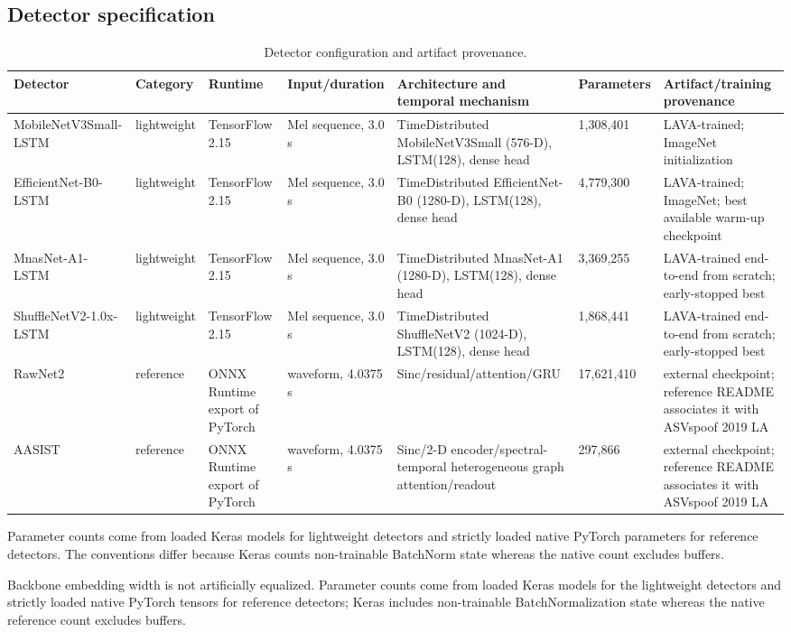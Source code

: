 \documentclass[10pt,journal]{IEEEtran}
\begin{document}
\subsection{Detector specification}
\begin{table}[htbp]
\centering
\small
\caption{Detector configuration and artifact provenance.}
\label{tab:4}
\begin{tabularx}{\textwidth}{lXXXXXX}
\toprule
Detector & Category & Runtime & Input/duration & Architecture and temporal mechanism & Parameters & Artifact/training provenance \\
\midrule
MobileNetV3Small-LSTM & lightweight & TensorFlow 2.15 & Mel sequence, 3.0 s & TimeDistributed MobileNetV3Small (576-D), LSTM(128), dense head & 1,308,401 & LAVA-trained; ImageNet initialization \\
EfficientNet-B0-LSTM & lightweight & TensorFlow 2.15 & Mel sequence, 3.0 s & TimeDistributed EfficientNet-B0 (1280-D), LSTM(128), dense head & 4,779,300 & LAVA-trained; ImageNet; best available warm-up checkpoint \\
MnasNet-A1-LSTM & lightweight & TensorFlow 2.15 & Mel sequence, 3.0 s & TimeDistributed MnasNet-A1 (1280-D), LSTM(128), dense head & 3,369,255 & LAVA-trained end-to-end from scratch; early-stopped best \\
ShuffleNetV2-1.0x-LSTM & lightweight & TensorFlow 2.15 & Mel sequence, 3.0 s & TimeDistributed ShuffleNetV2 (1024-D), LSTM(128), dense head & 1,868,441 & LAVA-trained end-to-end from scratch; early-stopped best \\
RawNet2 & reference & ONNX Runtime export of PyTorch & waveform, 4.0375 s & Sinc/residual/attention/GRU & 17,621,410 & external checkpoint; reference README associates it with ASVspoof 2019 LA \\
AASIST & reference & ONNX Runtime export of PyTorch & waveform, 4.0375 s & Sinc/2-D encoder/spectral-temporal heterogeneous graph attention/readout & 297,866 & external checkpoint; reference README associates it with ASVspoof 2019 LA \\
\bottomrule
\end{tabularx}
\end{table}
Parameter counts come from loaded Keras models for lightweight detectors and strictly loaded native PyTorch parameters for reference detectors. The conventions differ because Keras counts non-trainable BatchNorm state whereas the native count excludes buffers.

Backbone embedding width is not artificially equalized. Parameter counts come from loaded Keras models for the lightweight detectors and strictly loaded native PyTorch tensors for reference detectors; Keras includes non-trainable BatchNormalization state whereas the native reference count excludes buffers.
\end{document}

